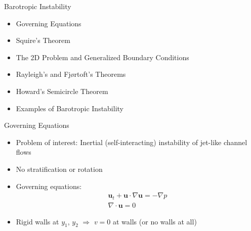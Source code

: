 \documentclass[landscape]{seminar}
\begin{document}
\begin{slide}

\begin{center}
Barotropic Instability
\end{center}

\begin{itemize}
  \item Governing Equations

  \item Squire's Theorem

  \item The 2D Problem and Generalized Boundary Conditions

  \item Rayleigh's and Fj\o rtoft's Theorems

  \item Howard's Semicircle Theorem

  \item Examples of Barotropic Instability
\end{itemize}

\end{slide}
\begin{slide}

\begin{center}Governing Equations\end{center}

\begin{itemize}
  \item Problem of interest: Inertial (self-interacting) instability of jet-like channel flows

  \item No stratification or rotation

  \item Governing equations:
\begin{subequations}
\begin{gather}
\bm{u}_t + \bm{u} \cdot \nabla \bm{u} = - \nabla p \\
\nabla \cdot \bm{u} = 0
\end{gather}
\end{subequations}

  \item Rigid walls at $y_1$, $y_2$ $\Rightarrow$ $v = 0$ at walls (or no walls at all)

\end{itemize}

\end{slide}
\end{document}
